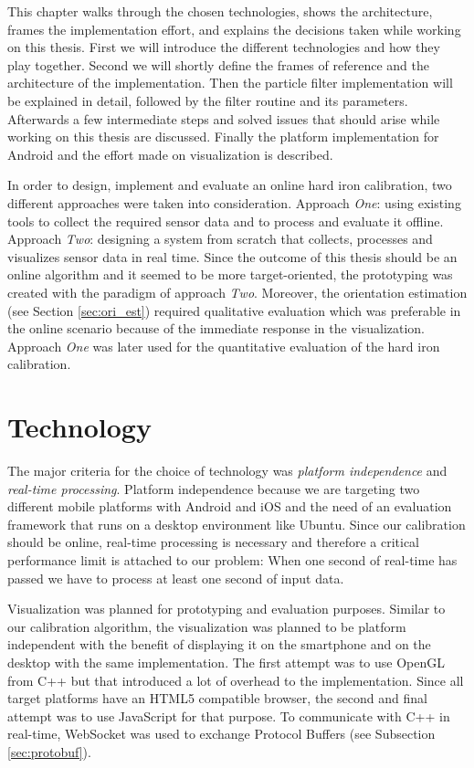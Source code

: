 This chapter walks through the chosen technologies, shows the architecture, frames the implementation effort, and explains the decisions taken while working on this thesis. First we will introduce the different technologies and how they play together. Second we will shortly define the frames of reference and the architecture of the implementation. Then the particle filter implementation will be explained in detail, followed by the filter routine and its parameters. Afterwards a few intermediate steps and solved issues that should arise while working on this thesis are discussed. Finally the platform implementation for Android and the effort made on visualization is described.

In order to design, implement and evaluate an online hard iron calibration, two different approaches were taken into consideration. Approach \textit{One}: using existing tools to collect the required sensor data and to process and evaluate it offline. Approach \textit{Two}: designing a system from scratch that collects, processes and visualizes sensor data in real time. Since the outcome of this thesis should be an online algorithm and it seemed to be more target-oriented, the prototyping was created with the paradigm of approach \textit{Two}. Moreover, the orientation estimation (see Section \ref{sec:ori_est}) required qualitative evaluation which was preferable in the online scenario because of the immediate response in the visualization. Approach \textit{One} was later used for the quantitative evaluation of the hard iron calibration.

\section{Technology}

The major criteria for the choice of technology was \textit{platform independence} and \textit{real-time processing}. Platform independence because we are targeting two different mobile platforms with Android and iOS and the need of an evaluation framework that runs on a desktop environment like Ubuntu. Since our calibration should be online, real-time processing is necessary and therefore a critical performance limit is attached to our problem: When one second of real-time has passed we have to process at least one second of input data.

Visualization was planned for prototyping and evaluation purposes. Similar to our calibration algorithm, the visualization was planned to be platform independent with the benefit of displaying it on the smartphone and on the desktop with the same implementation. The first attempt was to use OpenGL from C++ but that introduced a lot of overhead to the implementation. Since all target platforms have an HTML5 compatible browser, the second and final attempt was to use JavaScript for that purpose. To communicate with C++ in real-time, WebSocket was used to exchange Protocol Buffers (see Subsection \ref{sec:protobuf}).

